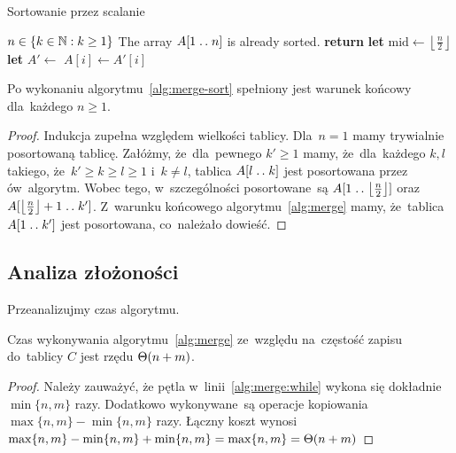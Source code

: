 \begin{algorithm}
    \label{alg:merge-sort}
    \caption{Sortowanie przez scalanie}
    \begin{algorithmic}[1]
        \Require \( n \in \{ k \in \mathbb{N} : k \ge 1 \} \)
        \Ensure The array \( A[1 \mathrel{{.}\,{.}}\nobreak n] \) is already sorted.
                \State \textbf{return}
            \EndIf
            \State \textbf{let} 
                \( \text{mid} \gets 
                \left\lfloor \frac{n}{2} \right\rfloor \)
            \State {}
            \State {}
            \State \textbf{let} 
                \( A' \gets \) 
                \State \( A[i] \gets A'[i] \)
            \EndFor
        \EndProcedure%
    \end{algorithmic}
\end{algorithm}

\begin{fact}
    Po wykonaniu algorytmu~\ref{alg:merge-sort} 
    spełniony jest warunek
    końcowy dla~każdego \( n \ge 1\).
\end{fact}
\begin{proof}
    Indukcja zupełna względem wielkości tablicy.
    Dla~\( n = 1 \) mamy trywialnie posortowaną tablicę.
    Załóżmy, że~dla~pewnego \( k' \ge 1 \) mamy, 
    że~dla~każdego \( k, l \) takiego, 
    że~\( k' \ge k \ge l \ge 1 \) i~\( k \neq l \),
    tablica \( A[l \mathrel{{.}\,{.}}\nobreak k] \) jest posortowana przez
    ów~algorytm. Wobec tego, w~szczególności
    posortowane~są \( A[1 \mathrel{{.}\,{.}}\nobreak 
    \left\lfloor \frac{n}{2} \right\rfloor] \) oraz \(
    A[\left\lfloor \frac{n}{2} \right\rfloor + 1 \mathrel{{.}\,{.}}\nobreak k'] \). 
    Z~warunku końcowego algorytmu~\ref{alg:merge}
    mamy, że~tablica \(A[1 \mathrel{{.}\,{.}}\nobreak k']\) jest posortowana,
    co~należało dowieść.
\end{proof}

\subsection{Analiza złożoności}
Przeanalizujmy czas algorytmu.

\begin{fact}
    Czas wykonywania algorytmu~\ref{alg:merge}
    ze~względu na~częstość zapisu do~tablicy \( C \) 
    jest rzędu
    \( \Theta (n + m) \).
\end{fact}
\begin{proof}
    Należy zauważyć, że pętla w~linii~\ref{alg:merge:while}
    wykona się dokładnie \( \min \{ n, m \} \) razy.
    Dodatkowo wykonywane~są operacje kopiowania
    \( \max \{ n, m \} - \min \{ n, m \} \)
    razy. Łączny koszt wynosi 
    \( \max \{ n, m \} - \min \{ n, m \} + \min \{ n, m \} 
    = \max \{ n, m \} = \Theta (n + m) \)
\end{proof}

